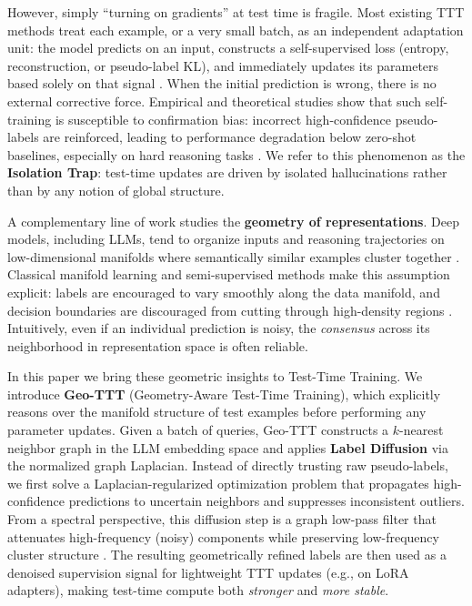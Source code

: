 \documentclass{article}
\theoremstyle{plain}
\theoremstyle{definition}
\theoremstyle{remark}
\begin{document}
However, simply “turning on gradients” at test time is fragile. Most existing TTT methods treat each example, or a very small batch, as an independent adaptation unit: the model predicts on an input, constructs a self-supervised loss (entropy, reconstruction, or pseudo-label KL), and immediately updates its parameters based solely on that signal \cite{sun2020ttt, wang2021tent, sun2023learning}. When the initial prediction is wrong, there is no external corrective force. Empirical and theoretical studies show that such self-training is susceptible to confirmation bias: incorrect high-confidence pseudo-labels are reinforced, leading to performance degradation below zero-shot baselines, especially on hard reasoning tasks \cite{chen2024understanding, kumar2024consistency, wu2024representational}. We refer to this phenomenon as the \textbf{Isolation Trap}: test-time updates are driven by isolated hallucinations rather than by any notion of global structure.

A complementary line of work studies the \textbf{geometry of representations}. Deep models, including LLMs, tend to organize inputs and reasoning trajectories on low-dimensional manifolds where semantically similar examples cluster together \cite{mamou2020emergence, reiss2023geometric, bronstein2017geometric, park2024geometry}. Classical manifold learning and semi-supervised methods make this assumption explicit: labels are encouraged to vary smoothly along the data manifold, and decision boundaries are discouraged from cutting through high-density regions \cite{zhu2003lp, belkin2006manifoldreg, chapelle2005manifold}. Intuitively, even if an individual prediction is noisy, the \emph{consensus} across its neighborhood in representation space is often reliable.

In this paper we bring these geometric insights to Test-Time Training. We introduce \textbf{Geo-TTT} (Geometry-Aware Test-Time Training), which explicitly reasons over the manifold structure of test examples before performing any parameter updates. Given a batch of queries, Geo-TTT constructs a $k$-nearest neighbor graph in the LLM embedding space and applies \textbf{Label Diffusion} via the normalized graph Laplacian. Instead of directly trusting raw pseudo-labels, we first solve a Laplacian-regularized optimization problem that propagates high-confidence predictions to uncertain neighbors and suppresses inconsistent outliers. From a spectral perspective, this diffusion step is a graph low-pass filter that attenuates high-frequency (noisy) components while preserving low-frequency cluster structure \cite{belkin2006manifoldreg, bronstein2017geometric}. The resulting geometrically refined labels are then used as a denoised supervision signal for lightweight TTT updates (e.g., on LoRA adapters), making test-time compute both \emph{stronger} and \emph{more stable}.
\end{document}
